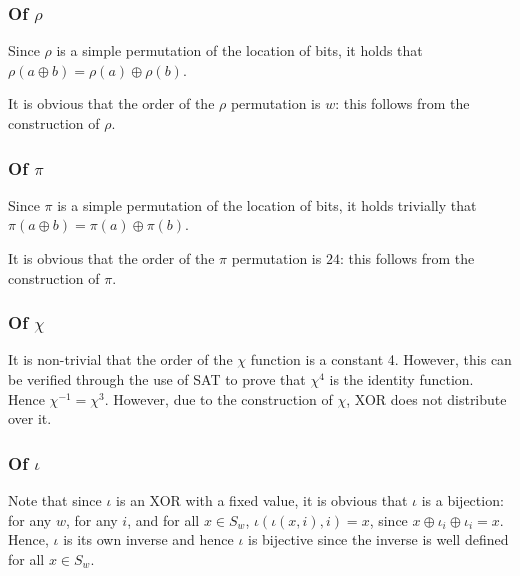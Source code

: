 \documentclass[10pt,twocolumn,twoside]{pnas-new}
\begin{document}
\subsubsection{Of $\rho$} \label{sec:p:r}


Since $\rho$ is a simple permutation of the location of bits, it holds that
$\rho(a \oplus b) = \rho(a) \oplus \rho(b)$.

It is obvious that the order of the $\rho$ permutation is $w$: this follows
from the construction of $\rho$.

\subsubsection{Of $\pi$} \label{sec:p:p}


Since $\pi$ is a simple permutation of the location of bits, it holds trivially
that $\pi(a \oplus b) = \pi(a) \oplus \pi(b)$.

It is obvious that the order of the $\pi$ permutation is $24$: this follows
from the construction of $\pi$.

\subsubsection{Of $\chi$} \label{sec:p:c}


It is non-trivial that the order of the $\chi$ function is a constant 4.
However, this can be verified through the use of SAT to prove that $\chi^{4}$
is the identity function. Hence $\chi^{-1} = \chi^{3}$. However, due to the
construction of $\chi$, XOR does not distribute over it.

\subsubsection{Of $\iota$} \label{sec:p:i}


Note that since $\iota$ is an XOR with a fixed value, it is obvious that
$\iota$ is a bijection: for any $w$, for any $i$, and for all $x \in S_{w}$,
$\iota(\iota(x, i), i) = x$, since $x \oplus \iota_{i} \oplus \iota_{i} = x$.
Hence, $\iota$ is its own inverse and hence $\iota$ is bijective since the
inverse is well defined for all $x \in S_{w}$.
\end{document}
